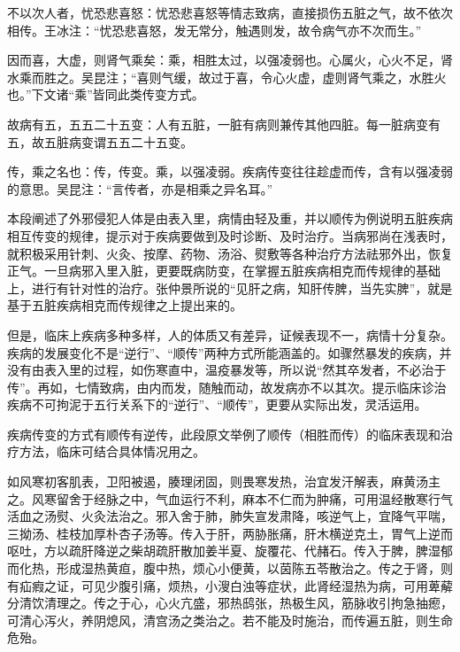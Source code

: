 \documentclass[draft,12pt]{ctexbook}
\begin{document}
\begin{jiaozhu}
  \item 不以次人者，忧恐悲喜怒：忧恐悲喜怒等情志致病，直接损伤五脏之气，故不依次相传。王冰注：“忧恐悲喜怒，发无常分，触遇则发，故令病气亦不次而生。”
  \item 因而喜，大虚，则肾气乘矣：乘，相胜太过，以强凌弱也。心属火，心火不足，肾水乘而胜之。吴昆注；“喜则气缓，故过于喜，令心火虚，虚则肾气乘之，水胜火也。”下文诸“乘”皆同此类传变方式。
  \item 故病有五，五五二十五变：人有五脏，一脏有病则兼传其他四脏。每一脏病变有五，故五脏病变谓五五二十五变。
  \item 传，乘之名也：传，传变。乘，以强凌弱。疾病传变往往趁虚而传，含有以强凌弱的意思。吴昆注：“言传者，亦是相乘之异名耳。”
\end{jiaozhu}



本段阐述了外邪侵犯人体是由表入里，病情由轻及重，并以顺传为例说明五脏疾病相互传变的规律，提示对于疾病要做到及时诊断、及时治疗。当病邪尚在浅表时，就积极采用针刺、火灸、按摩、药物、汤浴、熨敷等各种治疗方法祛邪外出，恢复正气。一旦病邪入里入脏，更要既病防变，在掌握五脏疾病相克而传规律的基础上，进行有针对性的治疗。张仲景所说的“见肝之病，知肝传脾，当先实脾”，就是基于五脏疾病相克而传规律之上提出来的。

但是，临床上疾病多种多样，人的体质又有差异，证候表现不一，病情十分复杂。疾病的发展变化不是“逆行”、“顺传”两种方式所能涵盖的。如骤然暴发的疾病，并没有由表入里的过程，如伤寒直中，温疫暴发等，所以说“然其卒发者，不必治于传”。再如，七情致病，由内而发，随触而动，故发病亦不以其次。提示临床诊治疾病不可拘泥于五行关系下的“逆行”、“顺传”，更要从实际出发，灵活运用。


疾病传变的方式有顺传有逆传，此段原文举例了顺传（相胜而传）的临床表现和治疗方法，临床可结合具体情况用之。

如风寒初客肌表，卫阳被遏，腠理闭固，则畏寒发热，治宜发汗解表，麻黄汤主之。风寒留舍于经脉之中，气血运行不利，麻本不仁而为肿痛，可用温经散寒行气活血之汤熨、火灸法治之。邪入舍于肺，肺失宣发肃降，咳逆气上，宜降气平喘，三拗汤、桂枝加厚朴杏子汤等。传入于肝，两胁胀痛，肝木横逆克土，胃气上逆而呕吐，方以疏肝降逆之柴胡疏肝散加姜半夏、旋覆花、代赭石。传入于脾，脾湿郁而化热，形成湿热黄疸，腹中热，烦心小便黄，以茵陈五苓散治之。传之于肾，则有疝瘕之证，可见少腹引痛，烦热，小溲白浊等症状，此肾经湿热为病，可用萆薢分清饮清理之。传之于心，心火亢盛，邪热鸱张，热极生风，筋脉收引拘急抽瘛，可清心泻火，养阴熄风，清宫汤之类治之。若不能及时施治，而传遍五脏，则生命危殆。
\end{document}
